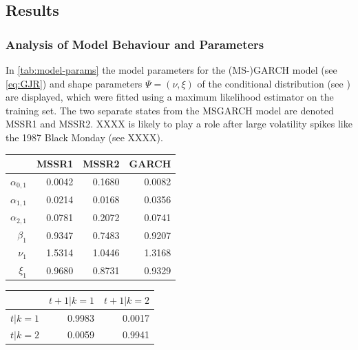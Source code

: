 \documentclass[11pt,a4paper]{article}
\begin{document}
\subsection{Results}

\subsubsection{Analysis of Model Behaviour and Parameters}


In \cref{tab:model-params} the model parameters for the (MS-)GARCH model (see \cref{eq:GJR}) and shape parameters $\Psi = (\nu, \xi)$ of the conditional distribution (see ) are displayed, which were fitted using a maximum likelihood estimator on the training set. 
The two separate states from the MSGARCH model are denoted MSSR1 and MSSR2.
XXXX is likely to play a role after large volatility spikes like the 1987 Black Monday (see XXXX).

\vspace{0.5cm}
\begin{minipage}[c]{0.5\textwidth}
	\begin{tabular}{rrrr}
		\hline
		& MSSR1 & MSSR2 & GARCH \\ 
		\hline
		$\alpha_{0,1}$ & 0.0042 & 0.1680 & 0.0082 \\ 
		$\alpha_{1,1}$ & 0.0214 & 0.0168 & 0.0356 \\ 
		$\alpha_{2,1}$ & 0.0781 & 0.2072 & 0.0741 \\ 
		$\beta_1$ & 0.9347 & 0.7483 & 0.9207 \\ 
		$\nu_1$ & 1.5314 & 1.0446 & 1.3168 \\ 
		$\xi_1$ & 0.9680 & 0.8731 & 0.9329 \\ 
		\hline
	\end{tabular}
	 \label{tab:model-params}
\end{minipage}
\begin{minipage}[c]{0.5\textwidth}
	\begin{tabular}{lrr} 
		\hline
		& $t+1 | k=1$ & $t+1 | k=2$ \\
		\hline
		$t | k=1$ & 0.9983 & 0.0017 \\
		$t | k=2$ & 0.0059 & 0.9941 \\
		\hline
	\end{tabular}
 	\label{tab:trans-probs}
\end{minipage}
\vspace{0.5cm}
\end{document}
